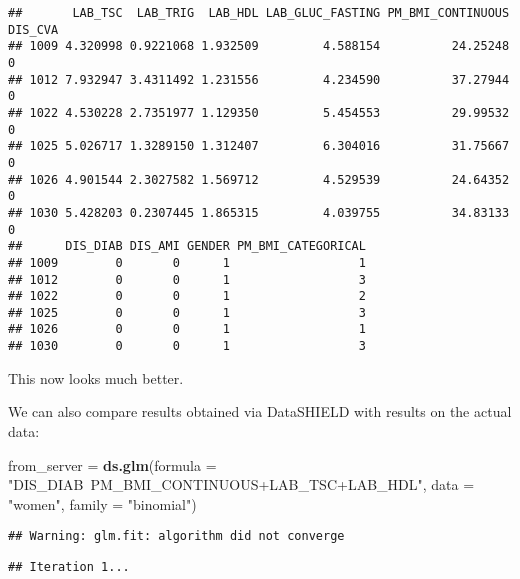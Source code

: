 \documentclass[
]{book}
\newenvironment{Shaded}{\begin{snugshade}}{\end{snugshade}}
\newcommand{\CommentTok}[1]{\textcolor[rgb]{0.56,0.35,0.01}{\textit{#1}}}
\newcommand{\DataTypeTok}[1]{\textcolor[rgb]{0.13,0.29,0.53}{#1}}
\newcommand{\KeywordTok}[1]{\textcolor[rgb]{0.13,0.29,0.53}{\textbf{#1}}}
\newcommand{\NormalTok}[1]{#1}
\newcommand{\OperatorTok}[1]{\textcolor[rgb]{0.81,0.36,0.00}{\textbf{#1}}}
\newcommand{\StringTok}[1]{\textcolor[rgb]{0.31,0.60,0.02}{#1}}
\begin{document}
\begin{Shaded}
\end{Shaded}

\begin{verbatim}
##       LAB_TSC  LAB_TRIG  LAB_HDL LAB_GLUC_FASTING PM_BMI_CONTINUOUS DIS_CVA
## 1009 4.320998 0.9221068 1.932509         4.588154          24.25248       0
## 1012 7.932947 3.4311492 1.231556         4.234590          37.27944       0
## 1022 4.530228 2.7351977 1.129350         5.454553          29.99532       0
## 1025 5.026717 1.3289150 1.312407         6.304016          31.75667       0
## 1026 4.901544 2.3027582 1.569712         4.529539          24.64352       0
## 1030 5.428203 0.2307445 1.865315         4.039755          34.83133       0
##      DIS_DIAB DIS_AMI GENDER PM_BMI_CATEGORICAL
## 1009        0       0      1                  1
## 1012        0       0      1                  3
## 1022        0       0      1                  2
## 1025        0       0      1                  3
## 1026        0       0      1                  1
## 1030        0       0      1                  3
\end{verbatim}

This now looks much better.

We can also compare results obtained via DataSHIELD with results on the actual data:

\begin{Shaded}
\begin{Highlighting}[]
\NormalTok{from_server =}\StringTok{ }\KeywordTok{ds.glm}\NormalTok{(}\DataTypeTok{formula =} \StringTok{"DIS_DIAB~PM_BMI_CONTINUOUS+LAB_TSC+LAB_HDL"}\NormalTok{, }\DataTypeTok{data =} \StringTok{"women"}\NormalTok{, }\DataTypeTok{family =} \StringTok{"binomial"}\NormalTok{)}
\end{Highlighting}
\end{Shaded}

\begin{verbatim}
## Warning: glm.fit: algorithm did not converge
\end{verbatim}

\begin{verbatim}
## Iteration 1...
\end{verbatim}
\end{document}
